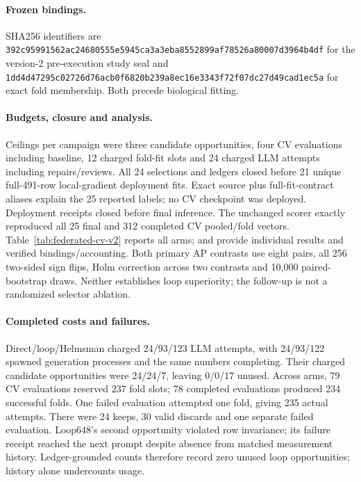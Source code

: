 \paragraph{Frozen bindings.}
SHA256 identifiers are
\texttt{392c95991562ac24\allowbreak{}680555e5945ca3a3\allowbreak{}eba8552899af7852\allowbreak{}6a80007d3964b4df}
for the version-2 pre-execution study seal and
\texttt{1dd4d47295c02726\allowbreak{}d76acb0f6820b239\allowbreak{}a8ec16e3343f72f0\allowbreak{}7dc27d49cad1ec5a}
for exact fold membership. Both precede biological fitting.

\paragraph{Budgets, closure and analysis.}
Ceilings per campaign were three candidate opportunities, four CV evaluations including baseline, 12 charged fold-fit slots and 24 charged LLM attempts including repairs/reviews. All 24 selections and ledgers closed before 21 unique full-491-row local-gradient deployment fits. Exact source plus full-fit-contract aliases explain the 25 reported labels; no CV checkpoint was deployed. Deployment receipts closed before final inference. The unchanged scorer exactly reproduced all 25 final and 312 completed CV pooled/fold vectors. Table~\ref{tab:federated-cv-v2} reports all arms;  and  provide individual results and verified bindings/accounting. Both primary AP contrasts use eight pairs, all 256 two-sided sign flips, Holm correction across two contrasts and 10,000 paired-bootstrap draws. Neither establishes loop superiority; the follow-up is not a randomized selector ablation.

\paragraph{Completed costs and failures.}
Direct/loop/Helmsman charged 24/93/123 LLM attempts, with 24/93/122 spawned generation processes and the same numbers completing. Their charged candidate opportunities were 24/24/7, leaving 0/0/17 unused. Across arms, 79 CV evaluations reserved 237 fold slots; 78 completed evaluations produced 234 successful folds. One failed evaluation attempted one fold, giving 235 actual attempts. There were 24 keeps, 30 valid discards and one separate failed evaluation. Loop648's second opportunity violated row invariance; its failure receipt reached the next prompt despite absence from matched measurement history. Ledger-grounded counts therefore record zero unused loop opportunities; history alone undercounts usage.

